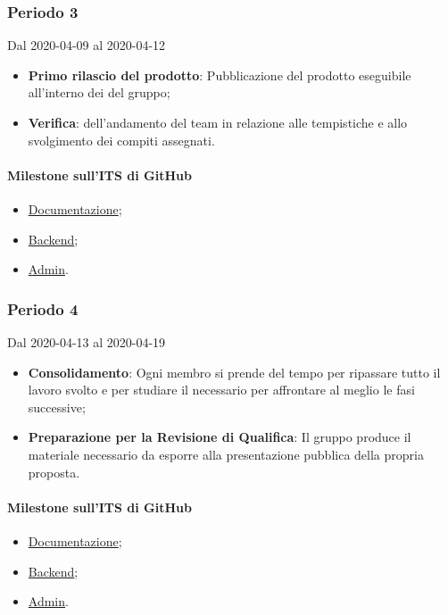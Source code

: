 \subsubsection{Periodo 3}
Dal 2020-04-09 al 2020-04-12
\begin{itemize}
	\item \textbf{Primo rilascio del prodotto}: Pubblicazione del prodotto eseguibile all'interno dei  del gruppo;
	\item \textbf{Verifica}:  dell'andamento del team in relazione alle tempistiche e allo svolgimento dei compiti assegnati.
\end{itemize}
\paragraph{Milestone sull'ITS di GitHub}
\begin{itemize}
	\item \href{https://github.com/qb-team/Stalker-Documentazione/milestone/13}{Documentazione};
	\item \href{https://github.com/qb-team/Stalker-Backend/milestone/3}{Backend};
	\item \href{https://github.com/qb-team/Stalker-Admin/milestone/3}{Admin}.
\end{itemize}

\subsubsection{Periodo 4} 
Dal 2020-04-13 al 2020-04-19
\begin{itemize}
	\item \textbf{Consolidamento}: Ogni membro si prende del tempo per ripassare tutto il lavoro svolto e per studiare il necessario per affrontare al meglio le fasi successive;
	\item \textbf{Preparazione per la Revisione di Qualifica}: Il gruppo produce il materiale necessario da esporre alla presentazione pubblica della propria proposta.
\end{itemize}
\paragraph{Milestone sull'ITS di GitHub}
\begin{itemize}
	\item \href{https://github.com/qb-team/Stalker-Documentazione/milestone/14}{Documentazione};
	\item \href{https://github.com/qb-team/Stalker-Backend/milestone/4}{Backend};
	\item \href{https://github.com/qb-team/Stalker-Admin/milestone/4}{Admin}.
\end{itemize}


